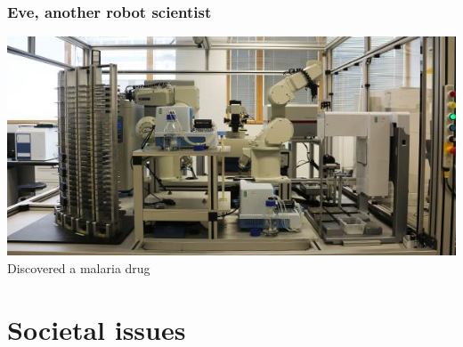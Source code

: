 \documentclass{beamer}
\begin{document}
\begin{frame}
  \frametitle{Eve, another robot scientist}
  \includegraphics[width=\textwidth]{figures/eve.jpg}
  Discovered a malaria drug
\end{frame}

\section{Societal issues}

\end{document}
